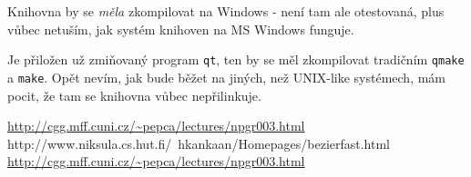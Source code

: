\documentclass[11pt]{article} %
\begin{document}
Knihovna by se \emph{měla} zkompilovat na Windows - není tam ale otestovaná, plus vůbec netuším, jak systém knihoven na MS Windows funguje.

Je přiložen už zmiňovaný program \texttt{qt}, ten by se měl zkompilovat tradičním \texttt{qmake} a \texttt{make}. Opět nevím, jak bude běžet na jiných, než UNIX-like systémech, mám pocit, že tam se knihovna vůbec nepřilinkuje.

\begin{thebibliography}{9}

     \url{http://cgg.mff.cuni.cz/~pepca/lectures/npgr003.html}
       http://www.niksula.cs.hut.fi/~hkankaan/Homepages/bezierfast.html
       \url{http://cgg.mff.cuni.cz/~pepca/lectures/npgr003.html}
     
 \end{thebibliography}
\end{document}
